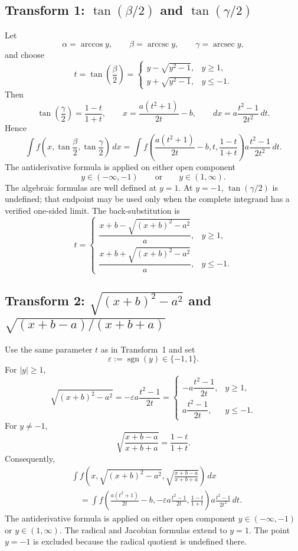 \documentclass[11pt]{article}
\theoremstyle{remark}
\DeclareMathOperator{\arccsc}{arccsc}
\DeclareMathOperator{\arcsec}{arcsec}
\DeclareMathOperator{\sgn}{sgn}
\begin{document}
\subsection*{Transform 1: $\tan(\beta/2)$ and $\tan(\gamma/2)$}

Let
\[
\alpha=\arccos y,
\qquad
\beta=\arccsc y,
\qquad
\gamma=\arcsec y,
\]
and choose
\[
t=\tan\!\left(\frac{\beta}{2}\right)
=
\begin{cases}
y-\sqrt{y^2-1},&y\ge1,\\[1mm]
y+\sqrt{y^2-1},&y\le-1.
\end{cases}
\]
Then
\[
\tan\!\left(\frac{\gamma}{2}\right)=\frac{1-t}{1+t},
\qquad
x=\frac{a(t^2+1)}{2t}-b,
\qquad
dx=a\frac{t^2-1}{2t^2}\,dt.
\]
Hence
\[
\int f\!\left(x,\tan\frac{\beta}{2},\tan\frac{\gamma}{2}\right)\,dx
=
\int f\!\left(\frac{a(t^2+1)}{2t}-b,t,\frac{1-t}{1+t}\right)
 a\frac{t^2-1}{2t^2}\,dt.
\]
The antiderivative formula is applied on either open component
\[
y\in(-\infty,-1)
\qquad\text{or}\qquad
y\in(1,\infty).
\]
The algebraic formulas are well defined at $y=1$. At $y=-1$, $\tan(\gamma/2)$ is undefined; that endpoint may be used only when the complete integrand has a verified one-sided limit. The back-substitution is
\[
t=
\begin{cases}
\dfrac{x+b-\sqrt{(x+b)^2-a^2}}{a},&y\ge1,\\[3mm]
\dfrac{x+b+\sqrt{(x+b)^2-a^2}}{a},&y\le-1.
\end{cases}
\]

\subsection*{Transform 2: $\sqrt{(x+b)^2-a^2}$ and $\sqrt{(x+b-a)/(x+b+a)}$}

Use the same parameter $t$ as in Transform~1 and set
\[
\varepsilon:=\sgn(y)\in\{-1,1\}.
\]
For $|y|\ge1$,
\[
\sqrt{(x+b)^2-a^2}
=-\varepsilon a\frac{t^2-1}{2t}
=
\begin{cases}
-a\dfrac{t^2-1}{2t},&y\ge1,\\[2mm]
a\dfrac{t^2-1}{2t},&y\le-1.
\end{cases}
\]
For $y\ne-1$,
\[
\sqrt{\frac{x+b-a}{x+b+a}}=\frac{1-t}{1+t}.
\]
Consequently,
\begin{align*}
&\int f\!\left(x,\sqrt{(x+b)^2-a^2},\sqrt{\frac{x+b-a}{x+b+a}}\right)\,dx\\
&\quad=
\int f\!\left(
\frac{a(t^2+1)}{2t}-b,
-\varepsilon a\frac{t^2-1}{2t},
\frac{1-t}{1+t}
\right)
a\frac{t^2-1}{2t^2}\,dt.
\end{align*}
The antiderivative formula is applied on either open component $y\in(-\infty,-1)$ or $y\in(1,\infty)$. The radical and Jacobian formulas extend to $y=1$. The point $y=-1$ is excluded because the radical quotient is undefined there.
\end{document}
